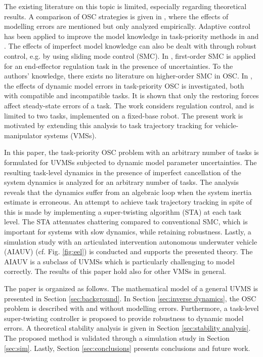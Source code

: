 \documentclass[../main.tex]{subfiles}
\begin{document}
The existing literature on this topic is limited, especially regarding theoretical results. A comparison of OSC strategies is given in \cite{Nakanishi2008}, where the effects of modelling errors are mentioned but only analyzed empirically. Adaptive control has been applied to improve the model knowledge in task-priority methods in \cite{Lee2019} and \cite{Garofalo2021}. The effects of imperfect model knowledge can also be dealt with through robust control, e.g. by using sliding mode control (SMC). In \cite{slotine1988}, first-order SMC is applied for an end-effector regulation task in the presence of uncertainties. To the authors' knowledge, there exists no literature on higher-order SMC in OSC. In \cite{Antonelli2018a, Dilillo2021}, the effects of dynamic model errors in task-priority OSC is investigated, both with compatible and incompatible tasks. It is shown that only the restoring forces affect steady-state errors of a task. The work considers regulation control, and is limited to two tasks, implemented on a fixed-base robot. The present work is motivated by extending this analysis to task trajectory tracking for vehicle-manipulator systems (VMSs).

In this paper, the task-priority OSC problem with an arbitrary number of tasks is formulated for UVMSs subjected to dynamic model parameter uncertainties. The resulting task-level dynamics in the presence of imperfect cancellation of the system dynamics is analyzed for an arbitrary number of tasks. The analysis reveals that the dynamics suffer from an algebraic loop when the system inertia estimate is erroneous. An attempt to achieve task trajectory tracking in spite of this is made by implementing a super-twisting algorithm (STA) at each task level. The STA attenuates chattering compared to conventional SMC, which is important for systems with slow dynamics, while retaining robustness. Lastly, a simulation study with an articulated intervention autonomous underwater vehicle (AIAUV) (cf. Fig. \ref{fig:eel}) is conducted and supports the presented theory. The AIAUV is a subclass of UVMSs which is particularly challenging to model correctly. The results of this paper hold also for other VMSs in general.

The paper is organized as follows. The mathematical model of a general UVMS is presented in Section \ref{sec:background}. In Section \ref{sec:inverse dynamics}, the OSC problem is described with and without modelling errors. Furthermore, a task-level super-twisting controller is proposed to provide robustness to dynamic model errors. A theoretical stability analysis is given in Section \ref{sec:stability analysis}. The proposed method is validated through a simulation study in Section \ref{sec:sim}. Lastly, Section \ref{sec:conclusions} presents conclusions and future work.
\end{document}
